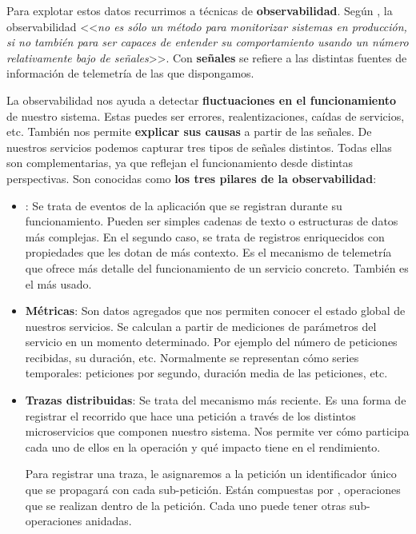 Para explotar estos datos recurrimos a técnicas de \textbf{observabilidad}. Según \cite{parkerProblemDistributedTracing2020}, la observabilidad <<\emph{no es sólo un método para monitorizar sistemas en producción, si no también para ser capaces de entender su comportamiento usando un número relativamente bajo de señales}>>. Con \textbf{señales} se refiere a las distintas fuentes de información de telemetría de las que dispongamos.

La observabilidad nos ayuda a detectar \textbf{fluctuaciones en el funcionamiento} de nuestro sistema. Estas puedes ser errores, realentizaciones, caídas de servicios, etc. También nos permite \textbf{explicar sus causas} a partir de las señales. De nuestros servicios podemos capturar tres tipos de señales distintos. Todas ellas son complementarias, ya que reflejan el funcionamiento desde distintas perspectivas. Son conocidas como \textbf{los tres pilares de la observabilidad}:

\begin{itemize}
  \item \textbf{}: Se trata de eventos de la aplicación que se registran durante su funcionamiento. Pueden ser simples cadenas de texto o estructuras de datos más complejas. En el segundo caso, se trata de registros enriquecidos con propiedades que les dotan de más contexto. Es el mecanismo de telemetría que ofrece más detalle del funcionamiento de un servicio concreto. También es el más usado.

  \item \textbf{Métricas}: Son datos agregados que nos permiten conocer el estado global de nuestros servicios. \cite{opentelemetryOpenTelemetryDocumentation2022} Se calculan a partir de mediciones de parámetros del servicio en un momento determinado. Por ejemplo del número de peticiones recibidas, su duración, etc. Normalmente se representan cómo series temporales: peticiones por segundo, duración media de las peticiones, etc.

  \item \textbf{Trazas distribuidas}: Se trata del mecanismo más reciente. Es una forma de registrar el recorrido que hace una petición a través de los distintos microservicios que componen nuestro sistema. Nos permite ver cómo participa cada uno de ellos en la operación y qué impacto tiene en el rendimiento. \cite{parkerProblemDistributedTracing2020}

  Para registrar una traza, le asignaremos a la petición un identificador único que se propagará con cada sub-petición. Están compuestas por , operaciones que se realizan dentro de la petición. Cada uno puede tener otras sub-operaciones anidadas. \cite{opentelemetryOpenTelemetryDocumentation2022}
\end{itemize}

